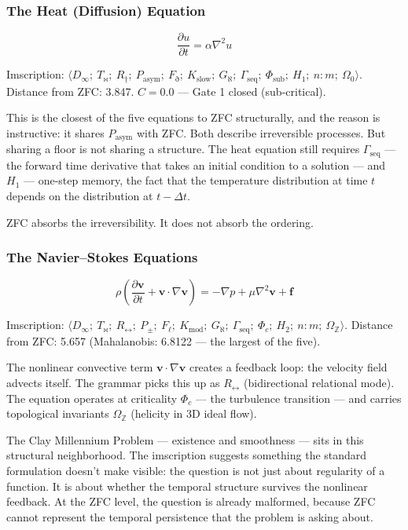\documentclass[12pt,a4paper]{article}
\begin{document}
\subsubsection{The Heat (Diffusion) Equation}

\[\frac{\partial u}{\partial t} = \alpha\nabla^2 u\]

Imscription: $\langle D_{\infty};\ T_{\bowtie};\ R_{\dagger};\ P_\text{asym};\ F_{\eth};\ K_\text{slow};\ G_{\aleph};\ \Gamma_\text{seq};\ \Phi_\text{sub};\ H_1;\ n{:}m;\ \Omega_0 \rangle$. Distance from ZFC: 3.847. $C = 0.0$ --- Gate 1 closed (sub-critical).

This is the closest of the five equations to ZFC structurally, and the reason is instructive: it shares $P_\text{asym}$ with ZFC. Both describe irreversible processes. But sharing a floor is not sharing a structure. The heat equation still requires $\Gamma_\text{seq}$ --- the forward time derivative that takes an initial condition to a solution --- and $H_1$ --- one-step memory, the fact that the temperature distribution at time $t$ depends on the distribution at $t - \Delta t$.

ZFC absorbs the irreversibility. It does not absorb the ordering.

\subsubsection{The Navier--Stokes Equations}

\[\rho\left(\frac{\partial\mathbf{v}}{\partial t} + \mathbf{v}\cdot\nabla\mathbf{v}\right) = -\nabla p + \mu\nabla^2\mathbf{v} + \mathbf{f}\]

Imscription: $\langle D_{\infty};\ T_{\bowtie};\ R_{\leftrightarrow};\ P_{\pm};\ F_{\ell};\ K_\text{mod};\ G_{\aleph};\ \Gamma_\text{seq};\ \Phi_c;\ H_2;\ n{:}m;\ \Omega_\mathbb{Z} \rangle$. Distance from ZFC: 5.657 (Mahalanobis: 6.8122 --- the largest of the five).

The nonlinear convective term $\mathbf{v}\cdot\nabla\mathbf{v}$ creates a feedback loop: the velocity field advects itself. The grammar picks this up as $R_{\leftrightarrow}$ (bidirectional relational mode). The equation operates at criticality $\Phi_c$ --- the turbulence transition --- and carries topological invariants $\Omega_\mathbb{Z}$ (helicity in 3D ideal flow).

The Clay Millennium Problem --- existence and smoothness --- sits in this structural neighborhood. The imscription suggests something the standard formulation doesn't make visible: the question is not just about regularity of a function. It is about whether the temporal structure survives the nonlinear feedback. At the ZFC level, the question is already malformed, because ZFC cannot represent the temporal persistence that the problem is asking about.
\end{document}
